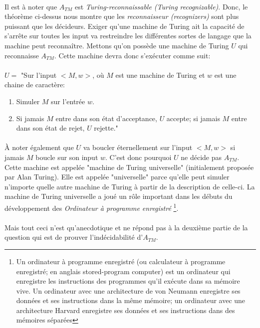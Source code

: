 \paragraph{}
Il est à noter que $A_{TM}$ est \textit{Turing-reconnaissable (Turing recognizable)}. Donc, le théorème ci-dessus nous montre que les \textit{reconnaisseur (recognizers)} sont plus puissant que les décideurs. Exiger qu'une machine de Turing ait la capacité de s'arrête sur toutes les input va restreindre les différentes sortes de langage que la machine peut reconnaître. Mettons qu'on possède une machine de Turing $U$ qui reconnaisse $A_{TM}$. Cette machine devra donc s'exécuter comme suit: 
\paragraph{}
$U = $ "Sur l'input $<M, w>$, où $M$ est une machine de Turing et $w$ est une chaine de caractère: 
\begin{enumerate}
\item Simuler $M$ sur l'entrée $w$.
\item Si jamais $M$ entre dans son état d'acceptance, $U$ accepte; si jamais $M$ entre dans son état de rejet, $U$ rejette."
\end{enumerate}
\paragraph{}
À noter également que $U$ va boucler éternellement sur l'input $<M, w>$ si jamais $M$ boucle sur son input $w$. C'est donc pourquoi $U$ ne décide pas $A_{TM}$. Cette machine est appelée "machine de Turing universelle" (initialement proposée par Alan Turing). Elle est appelée "universelle" parce qu'elle peut simuler n'importe quelle autre machine de Turing à partir de la description de celle-ci. La machine de Turing universelle a joué un rôle important dans les débuts du développement des \textit{Ordinateur à programme enregistré}
\footnote{Un ordinateur à programme enregistré (ou calculateur à programme enregistré; en anglais stored-program computer) est un ordinateur qui enregistre les instructions des programmes qu'il exécute dans sa mémoire vive.
Un ordinateur avec une architecture de von Neumann enregistre ses données et ses instructions dans la même mémoire; un ordinateur avec une architecture Harvard enregistre ses données et ses instructions dans des mémoires séparées}.

\paragraph{} Mais tout ceci n'est qu'anecdotique et ne répond pas à la deuxième partie de la question qui est de prouver l'indécidabilité d'$A_{TM}$.

